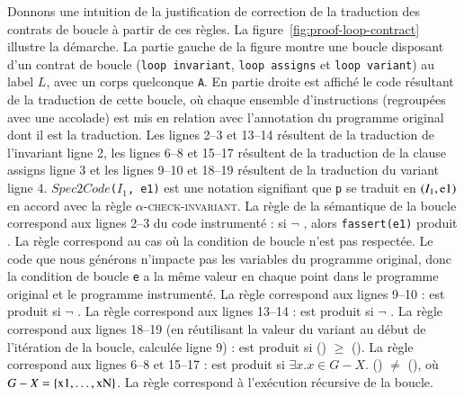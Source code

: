 {\scriptsize
  {
    {
    }
  }
}


Donnons une intuition de la justification de correction de la traduction des
contrats de boucle à partir de ces règles.
La figure~\ref{fig:proof-loop-contract} illustre la démarche.
La partie gauche de la figure montre une boucle disposant d'un contrat de boucle
(\lstinline'loop invariant', \lstinline'loop assigns' et
\lstinline'loop variant') au label $L$, avec un corps quelconque \lstinline'A'.
En partie droite est affiché le code résultant de la traduction de cette
boucle, où chaque ensemble d'instructions (regroupées avec une accolade) est
mis en relation avec l'annotation du programme original dont il est la
traduction.
Les lignes 2--3 et 13--14 résultent de la traduction de l'invariant ligne 2,
les lignes 6--8 et 15--17 résultent de la traduction de la clause assigns ligne
3 et les lignes 9--10 et 18--19 résultent de la traduction du variant ligne 4.
$Spec2Code$\lstinline'('$I_1$\lstinline', e1)' est une notation signifiant que
\lstinline'p' se traduit en $(I_1, \mbox{\lstinline'e1'})$ en accord avec la
règle \textsc{$\alpha$-check-invariant}.
La règle  de la sémantique de la boucle correspond aux
lignes 2--3 du code instrumenté : si $\lnot$ , alors
\lstinline'fassert(e1)' produit \errorenv.
La règle  correspond au cas où la condition de boucle n'est
pas respectée.
Le code que nous générons n'impacte pas les variables
du programme original, donc la condition de boucle \lstinline'e' a la même
valeur en chaque point dans le programme original et le programme instrumenté.
La règle  correspond aux lignes 9--10 : \errorenv est
produit si $\lnot$ .
La règle  correspond aux lignes 13--14 : \errorenv est
produit si $\lnot$ .
La règle  correspond aux lignes 18--19 (en réutilisant
la valeur du variant au début de l'itération de la boucle, calculée ligne 9) :
\errorenv est produit si () $\ge$
 ().
La règle  correspond aux lignes 6--8 et 15--17 :
\errorenv est produit si $\exists x. x \in G-X.$
() $\ne$  (),
où $G-X = \{\mbox{\lstinline'x1'},\ldots,\mbox{\lstinline'xN'}\}$.
La règle  correspond à l'exécution récursive de la boucle.


